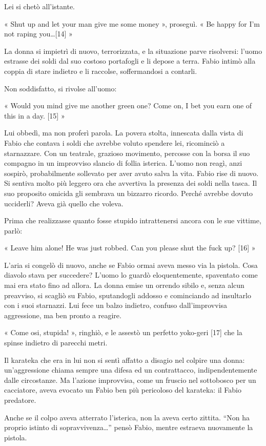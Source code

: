 Lei si chetò all'istante.

« Shut up and let your man give me some money », proseguì. « Be happy for I'm not raping you\ldots [14] »

La donna si impietrì di nuovo, terrorizzata, e la situazione parve risolversi: l'uomo estrasse dei soldi dal suo costoso portafogli e li depose a terra. Fabio intimò alla coppia di stare indietro e li raccolse, soffermandosi a contarli.

Non soddisfatto, si rivolse all'uomo:

« Would you mind give me another green one? Come on, I bet you earn one of this in a day. [15] »

Lui obbedì, ma non proferì parola. La povera stolta, innescata dalla vista di Fabio che contava i soldi che avrebbe voluto spendere lei, ricominciò a starnazzare. Con un teatrale, grazioso movimento, percosse con la borsa il suo compagno in un improvviso slancio di follia isterica. L'uomo non reagì, anzi sospirò, probabilmente sollevato per aver avuto salva la vita. Fabio rise di nuovo. Si sentiva molto più leggero ora che avvertiva la presenza dei soldi nella tasca. Il suo proposito omicida gli sembrava un bizzarro ricordo. Perché avrebbe dovuto ucciderli? Aveva già quello che voleva.

Prima che realizzasse quanto fosse stupido intrattenersi ancora con le sue vittime, parlò:

« Leave him alone! He was just robbed. Can you please shut the fuck up? [16] »

L'aria si congelò di nuovo, anche se Fabio ormai aveva messo via la pistola. Cosa diavolo stava per succedere? L'uomo lo guardò eloquentemente, spaventato come mai era stato fino ad allora. La donna emise un orrendo sibilo e, senza alcun preavviso, si scagliò su Fabio, sputandogli addosso e cominciando ad insultarlo con i suoi starnazzi. Lui fece un balzo indietro, confuso dall'improvvisa aggressione, ma ben pronto a reagire.

« Come osi, stupida! », ringhiò, e le assestò un perfetto yoko-geri [17] che la spinse indietro di parecchi metri.

Il karateka che era in lui non si sentì affatto a disagio nel colpire una donna: un'aggressione chiama sempre una difesa ed un contrattacco, indipendentemente dalle circostanze. Ma l'azione improvvisa, come un fruscio nel sottobosco per un cacciatore, aveva evocato un Fabio ben più pericoloso del karateka: il Fabio predatore.

Anche se il colpo aveva atterrato l'isterica, non la aveva certo zittita. ``Non ha proprio istinto di sopravvivenza\ldots'' pensò Fabio, mentre estraeva nuovamente la pistola.

